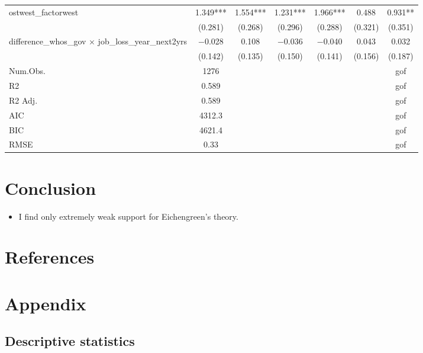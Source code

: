 \documentclass[
]{article}
\providecommand{\tightlist}{%
  \setlength{\itemsep}{0pt}\setlength{\parskip}{0pt}}
\begin{document}
\begin{table}[!h]
{\begin{tabular}[t]{lcccccc}
ostwest\_factorwest & \num{1.349}*** & \num{1.554}*** & \num{1.231}*** & \num{1.966}*** & \num{0.488} & \num{0.931}**\\
 & (\num{0.281}) & (\num{0.268}) & (\num{0.296}) & (\num{0.288}) & (\num{0.321}) & (\num{0.351})\\
difference\_whos\_gov × job\_loss\_year\_next2yrs & \num{-0.028} & \num{0.108} & \num{-0.036} & \num{-0.040} & \num{0.043} & \num{0.032}\\
 & (\num{0.142}) & (\num{0.135}) & (\num{0.150}) & (\num{0.141}) & (\num{0.156}) & (\num{0.187})\\
Num.Obs. & \num{1276} &  &  &  &  & gof\\
R2 & \num{0.589} &  &  &  &  & gof\\
R2 Adj. & \num{0.589} &  &  &  &  & gof\\
AIC & \num{4312.3} &  &  &  &  & gof\\
BIC & \num{4621.4} &  &  &  &  & gof\\
RMSE & \num{0.33} &  &  &  &  & gof\\
\bottomrule
\end{tabular}}
\end{table}

\hypertarget{conclusion}{%
\section{Conclusion}\label{conclusion}}

\begin{itemize}
\tightlist
\item
  I find only extremely weak support for Eichengreen's theory.
\end{itemize}

\FloatBarrier

\hypertarget{references}{%
\section{References}\label{references}}

\hypertarget{appendix}{%
\section{Appendix}\label{appendix}}

\hypertarget{descriptive-statistics}{%
\subsection{Descriptive statistics}\label{descriptive-statistics}}
\end{document}
